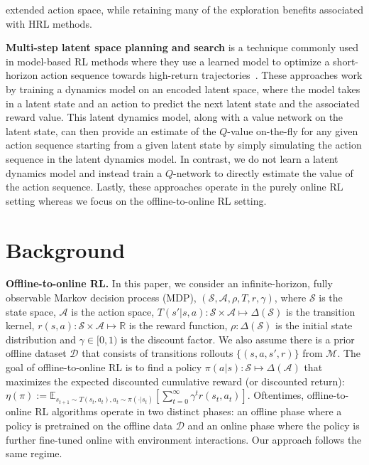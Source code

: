 extended action space, while retaining many of the exploration benefits associated with HRL methods.

\textbf{Multi-step latent space planning and search} is a technique commonly used in model-based RL methods where they use a learned model to optimize a short-horizon action sequence towards high-return trajectories~\citep{oh2017value, schrittwieser2020mastering}.
These approaches work by training a dynamics model on an encoded latent space, where the model takes in a latent state and an action to predict the next latent state and the associated reward value. This latent dynamics model, along with a value network on the latent state, can then provide an estimate of the $Q$-value on-the-fly for any given action sequence starting from a given latent state by simply simulating the action sequence in the latent dynamics model. In contrast, we do not learn a latent dynamics model and instead train a $Q$-network to directly estimate the value of the action sequence.
Lastly, these approaches operate in the purely online RL setting whereas we focus on the offline-to-online RL setting.




\section{Background}
\label{sec:preliminary}
\textbf{Offline-to-online RL.} In this paper, we consider an infinite-horizon, fully observable Markov decision process (MDP), $(\mathcal{S}, \mathcal{A}, \rho, T, r, \gamma)$, where $\mathcal{S}$ is the state space, $\mathcal{A}$ is the action space, $T(s'|s, a): \mathcal{S} \times \mathcal{A} \mapsto \Delta(\mathcal{S})$ is the transition kernel, $r(s, a): \mathcal{S}\times \mathcal{A}\mapsto \mathbb{R}$ is the reward function, $\rho: \Delta(\mathcal{S})$ is the initial state distribution and $\gamma \in [0, 1)$ is the discount factor. We also assume there is a prior offline dataset $\mathcal{D}$ that consists of transitions rollouts $\{(s, a, s', r)\}$ from $\mathcal{M}$. The goal of offline-to-online RL is to find a policy $\pi(a | s): \mathcal{S} \mapsto \Delta(\mathcal{A})$ that maximizes the expected discounted cumulative reward (or discounted return): $\eta(\pi) := \mathbb{E}_{s_{t+1} \sim T(s_t, a_t), a_t \sim \pi(\cdot | s_{t})}\left[\sum_{t=0}^{\infty} \gamma^t r(s_t, a_t)\right]$.
Oftentimes, offline-to-online RL algorithms operate in two distinct phases: an offline phase where a policy is pretrained on the offline data $\mathcal{D}$ and an online phase where the policy is further fine-tuned online with environment interactions. Our approach follows the same regime.




